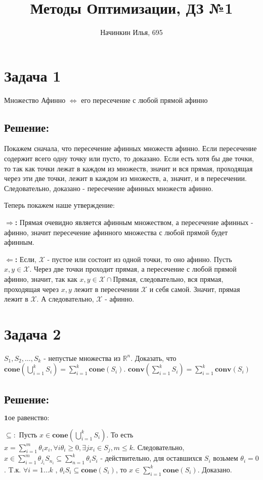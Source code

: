 \documentclass[a4paper]{article}
\title{Методы Оптимизации, ДЗ №1}
\author{Начинкин Илья, 695}
\begin{document}
\maketitle


\section*{Задача 1}
Множество Афинно $\Longleftrightarrow$ его пересечение с любой прямой афинно
\subsection*{Решение:}

Покажем сначала, что пересечение афинных множеств афинно.
Если пересечение содержит всего одну точку или пусто, то доказано. Если есть хотя бы две точки, то так как точки лежат в каждом из множеств, значит и вся прямая, проходящая через эти две точки, лежит в каждом из множеств, а, значит, и в пересечении. Следовательно, доказано - пересечение афинных множеств афинно. 

Теперь покажем наше утверждение:

\textbf{$\Longrightarrow$:} Прямая очевидно является афинным множеством, а пересечение афинных - афинно, значит пересечение афинного множества с любой прямой будет афинным.

\textbf{$\Longleftarrow$:} Если, $\mathcal{X}$  - пустое или состоит из одной точки, то оно афинно. Пусть $x, y \in \mathcal{X}$. Через две точки проходит прямая, а пересечение с любой прямой афинно, значит, так как $x, y \in \mathcal{X}\cap$Прямая, следовательно, вся прямая, проходящая через $x, y$ лежит в пересечении $\mathcal{X}$ и себя самой. Значит, прямая лежит в  $\mathcal{X}$. А следовательно, $\mathcal{X}$  - афинно.

\section*{Задача 2}
$S_{1},S_{2},  \ldots , S_{k} $ - непустые множества из $\mathbb{R}^{n}$. Доказать, что $\textbf{cone}(\bigcup_{i=1}^{k}S_{i}) = \sum_{i=1}^{k}\textbf{cone}(S_{i})$. $\textbf{conv}(\sum_{i=1}^{k}S_{i}) = \sum_{i=1}^{k}\textbf{conv}(S_{i})$
\subsection*{Решение:}
$\textbf{1ое равенство:}$ 

$\subseteq:$ Пусть $x \in \textbf{cone}(\bigcup_{i=1}^{k}S_{i})$. То есть $x = \sum_{i=1}^{m}\theta_{i}x_{i}, 	\forall{i}  \theta_{i}\geq0, \exists{j} x_{i} \in S_{j}, m \leq k$. Следовательно, $x \in \sum_{i=1}^{m}\theta_{j_i}S_{n_i} \subseteq \sum_{n=1}^{k}\theta_{i}S_{i}$ - действительно, для оставшихся $S_{i}$ возьмем $\theta_{i} = 0$. T.к. $\forall{i=1 \ldots k}$  ,  $\theta_{i}S_{i} \subseteq \textbf{cone}(S_{i})$, то $x \in \sum_{i=1}^{k}\textbf{cone}(S_{i})$. Доказано.
\end{document}
